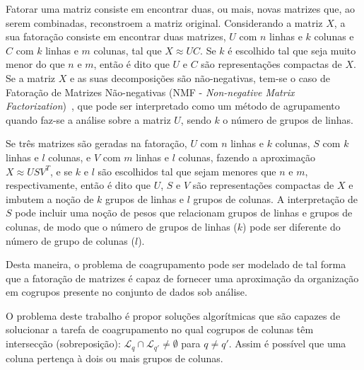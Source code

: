 \documentclass[
    12pt,                %
    oneside,            %
    a4paper,            %
    english,            %
    brazil                %
    ]{abntex2ppgsi}
\begin{document}
Fatorar uma matriz consiste em encontrar duas, ou mais, novas matrizes que, ao serem combinadas, reconstroem a matriz original.
Considerando a matriz $X$, a sua fatoração consiste em encontrar duas matrizes, $U$ com $n$ linhas e $k$ colunas e $C$ com $k$ linhas e $m$ colunas, tal que $X \approx UC$.
Se $k$ é escolhido tal que seja muito menor do que $n$ e $m$, então é dito que $U$ e $C$ são representações compactas de $X$.
Se a matriz $X$ e as suas decomposições são não-negativas, tem-se o caso de Fatoração de Matrizes Não-negativas (NMF - \textit{Non-negative Matrix Factorization})~\cite{lee:nnmf00}, que pode ser interpretado como um método de agrupamento quando faz-se a análise sobre a matriz $U$, sendo $k$ o número de grupos de linhas.

Se três matrizes são geradas na fatoração, $U$ com $n$ linhas e $k$ colunas, $S$ com $k$ linhas e $l$ colunas, e $V$ com $m$ linhas e $l$ colunas, fazendo a aproximação $X \approx USV^T$, e se $k$ e $l$ são escolhidos tal que sejam menores que $n$ e $m$, respectivamente, então é dito que $U$, $S$ e $V$ são representações compactas de $X$ e imbutem a noção de $k$ grupos de linhas e $l$ grupos de colunas.
A interpretação de $S$ pode incluir uma noção de pesos que relacionam grupos de linhas e grupos de colunas, de modo que o número de grupos de linhas ($k$) pode ser diferente do número de grupo de colunas ($l$).

Desta maneira, o problema de coagrupamento pode ser modelado de tal forma que a fatoração de matrizes é capaz de fornecer uma aproximação da organização em cogrupos presente no conjunto de dados sob análise.

O problema deste trabalho é propor soluções algorítmicas que são capazes de solucionar a tarefa de coagrupamento no qual cogrupos de colunas têm intersecção (sobreposição): $\mathcal{L}_q \cap \mathcal{L}_{q'} \neq \emptyset$ para $q \neq q'$.
Assim é possível que uma coluna pertença à dois ou mais grupos de colunas.



\end{document}
